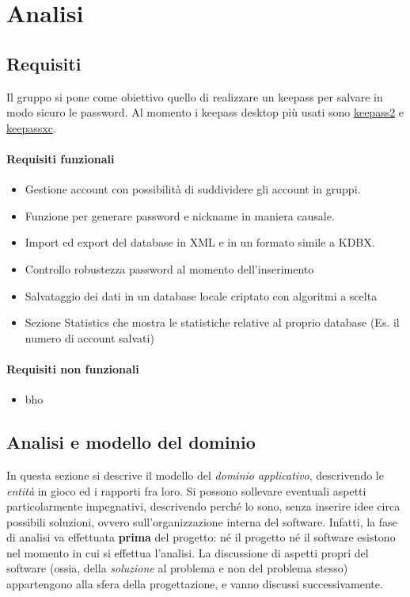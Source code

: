 \documentclass[a4paper,12pt]{report}
\begin{document}
\tableofcontents

\chapter{Analisi}

\section{Requisiti}

Il gruppo si pone come obiettivo quello di realizzare un keepass per salvare
in modo sicuro le password. Al momento i keepass desktop più usati sono
\href{https://keepass.info/}{keepass2} e \href{https://keepassxc.org/}{keepassxc}.

\subsubsection{Requisiti funzionali}
\begin{itemize}
  \item Gestione account con possibilità di suddividere gli account in gruppi.
  \item Funzione per generare password e nickname in maniera causale.
  \item Import ed export del database in XML e in un formato simile a KDBX.
  \item Controllo robustezza password al momento dell'inserimento
  \item Salvataggio dei dati in un database locale criptato con algoritmi a scelta
  \item Sezione Statistics che mostra le statistiche relative al proprio database (Es. il numero di account salvati)
\end{itemize}

\subsubsection{Requisiti non funzionali}
\begin{itemize}
	\item bho
\end{itemize}

\section{Analisi e modello del dominio}

In questa sezione si descrive il modello del \textit{dominio 
applicativo}, descrivendo le \textit{entità} in gioco ed i rapporti fra loro.
%
Si possono sollevare eventuali aspetti particolarmente impegnativi, descrivendo perché lo sono, senza inserire idee circa possibili soluzioni, ovvero sull'organizzazione interna del software.
%
Infatti, la fase di analisi va effettuata \textbf{prima} del progetto: né il progetto né il software esistono nel momento in cui si effettua l'analisi.
%
La discussione di aspetti propri del software (ossia, della \textit{soluzione} al problema e non del problema stesso) appartengono alla sfera della progettazione, e vanno discussi successivamente.
\end{document}
